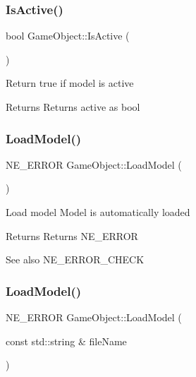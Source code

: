 \subsubsection{\texorpdfstring{IsActive()}{IsActive()}}
{\footnotesize\ttfamily bool Game\+Object\+::\+Is\+Active (\begin{DoxyParamCaption}{ }\end{DoxyParamCaption})}

Return true if model is active \begin{DoxyReturn}{Returns}
Returns active as bool 
\end{DoxyReturn}
\mbox{\label{class_game_object_acfd40d131da4847e23f2e01fb6751399}} 
\subsubsection{\texorpdfstring{LoadModel()}{LoadModel()}\hspace{0.1cm}{\footnotesize\ttfamily [1/2]}}
{\footnotesize\ttfamily N\+E\+\_\+\+E\+R\+R\+OR Game\+Object\+::\+Load\+Model (\begin{DoxyParamCaption}{ }\end{DoxyParamCaption})}

Load model Model is automatically loaded \begin{DoxyReturn}{Returns}
Returns N\+E\+\_\+\+E\+R\+R\+OR 
\end{DoxyReturn}
\begin{DoxySeeAlso}{See also}
N\+E\+\_\+\+E\+R\+R\+O\+R\+\_\+\+C\+H\+E\+CK 
\end{DoxySeeAlso}
\mbox{\label{class_game_object_a14f2f975d6c5005ee5fb9c4665cbfc4b}} 
\subsubsection{\texorpdfstring{LoadModel()}{LoadModel()}\hspace{0.1cm}{\footnotesize\ttfamily [2/2]}}
{\footnotesize\ttfamily N\+E\+\_\+\+E\+R\+R\+OR Game\+Object\+::\+Load\+Model (\begin{DoxyParamCaption}\item[{const std\+::string \&}]{file\+Name }\end{DoxyParamCaption})}

